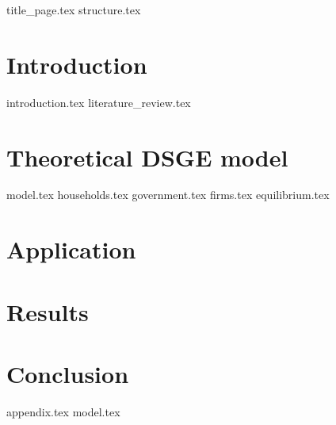 \documentclass[12pt]{article}
\begin{document}
\begin{sloppypar}
{title_page.tex}
\pagebreak
{structure.tex}
\pagebreak
{}
\section{Introduction}
{introduction.tex}
{literature_review.tex}

\section{Theoretical DSGE model}
{model.tex}
{households.tex}
{government.tex}
{firms.tex}
{equilibrium.tex}
\section{Application} \label{application}
\section{Results}
\section{Conclusion}
{appendix.tex}
{model.tex}

\end{sloppypar}
\end{document}

